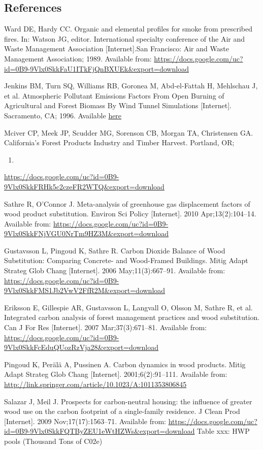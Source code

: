 \documentclass[a4paper]{article}
\begin{document}
\subsection{References}
\label{sec:orgheadline12}

Ward DE, Hardy CC. Organic and elemental profiles for smoke from
   prescribed fires. In: Watson JG, editor. International specialty
   conference of the Air and Waste Management Association
   [Internet].San Francisco: Air and Waste Management
   Association; 1989. Available from:
   \url{https://docs.google.com/uc?id=0B9-9Vlx0SkkFaU1ITkFjQnBXUEk&export=download}

Jenkins BM, Turn SQ, Williams RB, Goronea M, Abd-el-Fattah H,
   Mehlschau J, et al. Atmospheric Pollutant Emissions Factors From Open
   Burning of Agricultural and Forest Biomass By Wind Tunnel Simulations
   [Internet]. Sacramento, CA; 1996. Available
   \href{https://docs.google.com/uc?id=0B9-9Vlx0SkkFN1dQVjFkOXI1eVE&export=download}{here}

Mciver CP, Meek JP, Scudder MG, Sorenson CB, Morgan TA, Christensen GA.
California's Forest Products Industry and Timber Harvest. Portland, OR;
\begin{enumerate}
\item 
\end{enumerate}
\url{https://docs.google.com/uc?id=0B9-9Vlx0SkkFRHk5c2czeFR2WTQ&export=download}

Sathre R, O'Connor J. Meta-analysis of greenhouse gas displacement
factors of wood product substitution. Environ Sci Policy [Internet].
2010 Apr;13(2):104--14. Available from:
\url{https://docs.google.com/uc?id=0B9-9Vlx0SkkFNjVGU0NrTm9HZ3M&export=download}

Gustavsson L, Pingoud K, Sathre R. Carbon Dioxide Balance of Wood
Substitution: Comparing Concrete- and Wood-Framed Buildings. Mitig Adapt
Strateg Glob Chang [Internet]. 2006 May;11(3):667--91. Available from:
\url{https://docs.google.com/uc?id=0B9-9Vlx0SkkFMS1Jb2VwV2FfR2M&export=download}

Eriksson E, Gillespie AR, Gustavsson L, Langvall O, Olsson M, Sathre R,
et al. Integrated carbon analysis of forest management practices and
wood substitution. Can J For Res [Internet]. 2007 Mar;37(3):671--81.
Available from:
\url{https://docs.google.com/uc?id=0B9-9Vlx0SkkFcEduQUozRzVja28&export=download}

Pingoud K, Perälä A, Pussinen A. Carbon dynamics in wood products. Mitig
Adapt Strateg Glob Chang [Internet]. 2001;6(2):91--111. Available from:
\url{http://link.springer.com/article/10.1023/A:1011353806845}

Salazar J, Meil J. Prospects for carbon-neutral housing: the influence
of greater wood use on the carbon footprint of a single-family
residence. J Clean Prod [Internet]. 2009 Nov;17(17):1563--71. Available
from:
\url{https://docs.google.com/uc?id=0B9-9Vlx0SkkFQTByZEU1eWtHZWs&export=download}
Table xxx: HWP pools (Thousand Tons of C02e)



\end{document}

